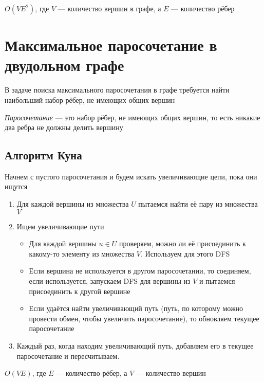 \documentclass[a4paper]{article}
\begin{document}
\difficulty $O(VE^2)$, где $V$ — количество вершин в графе, а $E$ — количество рёбер 


\newpage
\section{Максимальное паросочетание в двудольном графе}
В задаче поиска максимального паросочетания в графе требуется найти наибольший набор рёбер, не имеющих общих вершин

 \textit{Паросочетание} — это набор рёбер, не имеющих общих вершин, то есть никакие два ребра не должны делить вершину

\subsection{Алгоритм Куна}
Начнем с пустого паросочетания и будем искать увеличивающие цепи, пока они ищутся
\begin{enumerate}
    \item Для каждой вершины из множества $U$ пытаемся найти её пару из множества $V$
    \item Ищем увеличивающие пути
    \begin{itemize}
        \item Для каждой вершины \( u \in U \) проверяем, можно ли её присоединить к какому-то элементу из множества \( V \). Используем для этого DFS
        \item Если вершина не используется в другом паросочетании, то соединяем, если используется, запускаем DFS для вершины из $V$ и пытаемся присоединить к другой вершине
        \item Если удаётся найти увеличивающий путь (путь, по которому можно провести обмен, чтобы увеличить паросочетание), то обновляем текущее паросочетание
    \end{itemize}
    \item Каждый раз, когда находим увеличивающий путь, добавляем его в текущее паросочетание и пересчитываем.
\end{enumerate}

\difficulty \( O(VE) \), где \( E \) — количество рёбер, а \( V \) — количество вершин

\newpage
\end{document}
